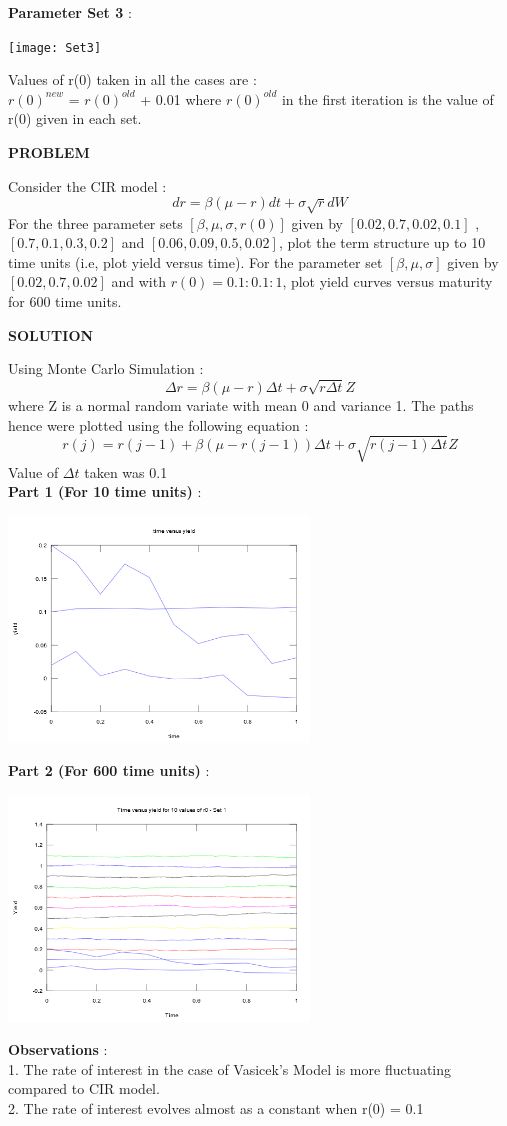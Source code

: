 \documentclass{article}
\begin{document}
 \textbf{Parameter Set 3} :
 \begin{center}
 \texttt{[image: Set3]}
 \end{center}
 
 Values of r(0) taken in all the cases are :\\
 $r(0)^{new}$ = $r(0)^{old}$  + 0.01 where  $r(0)^{old}$  in the first iteration is the value of r(0) given in each set.
 
\begin{center}
\textbf{PROBLEM}
\end{center}

Consider the CIR model :
$$dr = \beta(\mu - r)dt + \sigma \sqrt{r}dW$$
For the three parameter sets $[\beta , \mu , \sigma , r(0)]$ given by $[0.02 , 0.7 , 0.02 , 0.1]$ , $[0.7 , 0.1 , 0.3 , 0.2]$ and $[0.06 , 0.09 , 0.5 , 0.02]$, plot the term structure up to 10 time units (i.e, plot yield versus time). For the parameter
set $[\beta ,\mu , \sigma]$ given by $[0.02 , 0.7 , 0.02]$ and with $r(0) = 0.1 : 0.1 : 1$, plot yield curves versus maturity for 600 time units.

\begin{center}
\textbf{SOLUTION}
\end{center}
Using Monte Carlo Simulation :\\
$$\Delta r = \beta(\mu - r)\Delta t + \sigma \sqrt{r\Delta t}Z$$
where Z is a normal random variate with mean 0 and variance 1. The paths hence were plotted using the following equation :
$$r(j) = r(j-1) + \beta (\mu -r(j-1))\Delta t +\sigma \sqrt{r(j-1)\Delta t}Z$$
Value of $\Delta t$ taken was 0.1\\

\textbf{Part 1 (For 10 time units)} :
\begin{center}
\includegraphics[width = 80mm]{Part1Q2}
\end{center}

\textbf{Part 2 (For 600 time units)} :
\begin{center}
\includegraphics[width = 80mm]{Set1Q2}
\end{center}

\textbf{Observations} :\\
1. The rate of interest in the case of Vasicek's Model is more fluctuating compared to CIR model.\\
2. The rate of interest evolves almost as a constant when r(0) = 0.1\\
\end{document}
